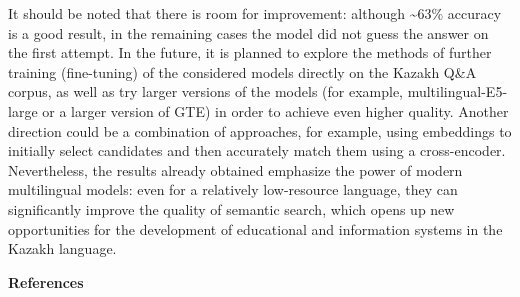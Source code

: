 \begin{multicols}{2}
It should be noted that there is room for improvement: although
\textasciitilde63\% accuracy is a good result, in the remaining cases
the model did not guess the answer on the first attempt. In the future,
it is planned to explore the methods of further training (fine-tuning)
of the considered models directly on the Kazakh Q\&A corpus, as well as
try larger versions of the models (for example, multilingual-E5-large or
a larger version of GTE) in order to achieve even higher quality.
Another direction could be a combination of approaches, for example,
using embeddings to initially select candidates and then accurately
match them using a cross-encoder. Nevertheless, the results already
obtained emphasize the power of modern multilingual models: even for a
relatively low-resource language, they can significantly improve the
quality of semantic search, which opens up new opportunities for the
development of educational and information systems in the Kazakh
language.
\end{multicols}

\begin{center}
{\bfseries References}
\end{center}


